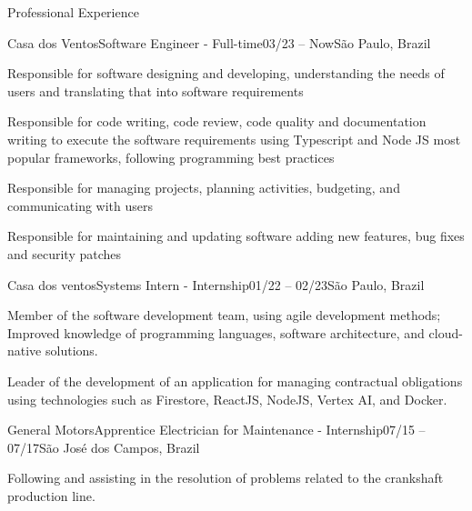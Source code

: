 \documentclass[]{template}
\begin{document}
\begin{section}{Professional Experience}
 \begin{subsection}{Casa dos Ventos}{Software Engineer - Full-time}{03/23 -- Now}{São Paulo, Brazil}
     \item Responsible for software designing and developing, understanding the needs of users and translating that into software requirements
     \item Responsible for code writing, code review, code quality and documentation writing to execute the software requirements using Typescript and Node JS most popular frameworks, following programming best practices
     \item Responsible for managing projects, planning activities, budgeting, and communicating with users
     \item Responsible for maintaining and updating software adding new features, bug fixes and security patches
 \end{subsection}
 
 \begin{subsection}{Casa dos ventos}{Systems Intern - Internship}{01/22 -- 02/23}{São Paulo, Brazil}
     \item Member of the software development team, using agile development methods; Improved knowledge of programming languages, software architecture, and cloud-native solutions.
     \item Leader of the development of an application for managing contractual obligations using technologies such as Firestore, ReactJS, NodeJS, Vertex AI, and Docker.
 \end{subsection}
 
 \begin{subsection}{General Motors}{Apprentice Electrician for Maintenance - Internship}{07/15 -- 07/17}{São José dos Campos, Brazil}
     \item Following and assisting in the resolution of problems related to the crankshaft production line.
 \end{subsection}
 
\end{section}



\end{document}
